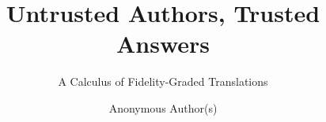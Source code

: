 \documentclass[sigplan,review,anonymous,10pt]{acmart}
\theoremstyle{definition}
\begin{document}
\title{Untrusted Authors, Trusted Answers}
\subtitle{A Calculus of Fidelity-Graded Translations}

\author{Anonymous Author(s)}

\begin{abstract}

\end{abstract}

\maketitle













\end{document}
